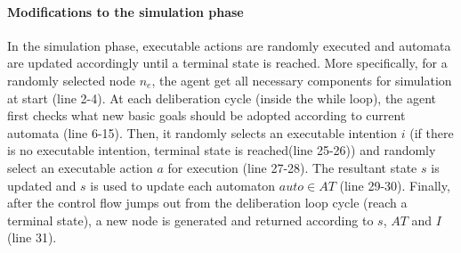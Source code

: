 \documentclass{article}
\begin{document}
\paragraph{Modifications to the simulation phase}
In the simulation phase, executable actions are randomly executed and automata are updated accordingly until a terminal state is reached. More specifically, for a randomly selected node $n_e$, the agent get all necessary components for simulation at start (line 2-4). At each deliberation cycle (inside the while loop), the agent first checks what new basic goals should be adopted according to current automata (line 6-15). Then, it randomly selects an executable intention $i$ (if there is no executable intention, terminal state is reached(line 25-26)) and randomly select an executable action $a$ for execution (line 27-28). The resultant state $s$ is updated and $s$ is used to update each automaton $auto \in AT$ (line 29-30). Finally, after the control flow jumps out from the deliberation loop cycle (reach a terminal state), a new node is generated and returned according to $s$, $AT$ and $I$ (line 31).
%




\end{document}
